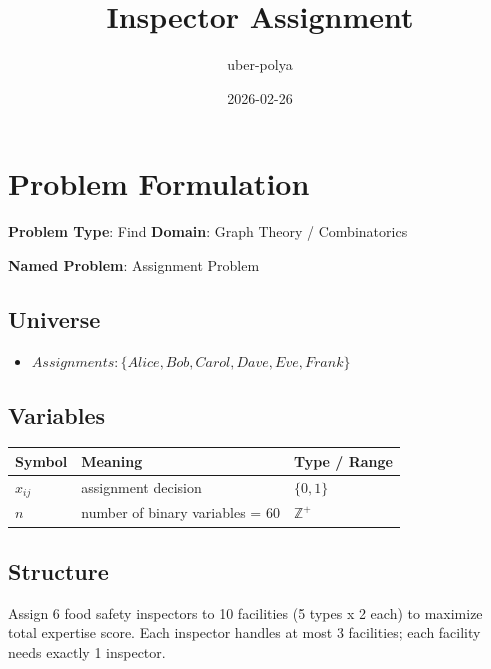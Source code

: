 \documentclass[11pt, a4paper]{article}
\title{Inspector Assignment}
\author{uber-polya}
\date{2026-02-26}
\begin{document}
\maketitle
\tableofcontents
\newpage

\section{Problem Formulation}

\begin{polyamodel}

\textbf{Problem Type}: Find \hfill
\textbf{Domain}: Graph Theory / Combinatorics

\textbf{Named Problem}: Assignment Problem

\end{polyamodel}

\subsection{Universe}

\begin{itemize}
  \item $Assignments: \{Alice, Bob, Carol, Dave, Eve, Frank\}$
\end{itemize}

\subsection{Variables}

\begin{longtable}{lll}
\toprule
\textbf{Symbol} & \textbf{Meaning} & \textbf{Type / Range} \\
\midrule
\endhead
$x_{ij}$ & assignment decision & $\{0, 1\}$ \\
$n$ & number of binary variables = 60 & $\mathbb{{Z}}^+$ \\
\bottomrule
\end{longtable}

\subsection{Structure}

Assign 6 food safety inspectors to 10 facilities (5 types x 2 each) to
maximize total expertise score. Each inspector handles at most 3 facilities;
each facility needs exactly 1 inspector.
\end{document}

